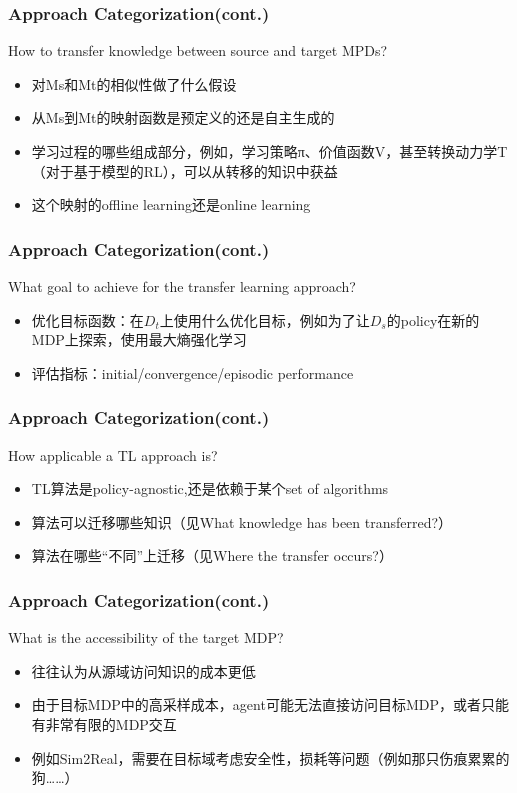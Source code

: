\documentclass[aspectratio=169]{beamer}
\begin{document}
\begin{frame}
  \frametitle{Approach Categorization(cont.)}
  How to transfer knowledge between source and target MPDs?
  \begin{itemize}
    \item 对Ms和Mt的相似性做了什么假设
    \item 从Ms到Mt的映射函数是预定义的还是自主生成的
    \item 学习过程的哪些组成部分，例如，学习策略π、价值函数V，甚至转换动力学T（对于基于模型的RL），可以从转移的知识中获益
    \item 这个映射的offline learning还是online learning
  \end{itemize}
\end{frame}


\begin{frame}
  \frametitle{Approach Categorization(cont.)}
  What goal to achieve for the transfer learning approach?
  \begin{itemize}
    \item 优化目标函数：在$D_t$上使用什么优化目标，例如为了让$D_s$的policy在新的MDP上探索，使用最大熵强化学习
    \item 评估指标：initial/convergence/episodic performance
  \end{itemize}
\end{frame}


\begin{frame}
  \frametitle{Approach Categorization(cont.)}
  How applicable a TL approach is?
  \begin{itemize}
    \item TL算法是policy-agnostic,还是依赖于某个set of algorithms
    \item 算法可以迁移哪些知识（见What knowledge has been transferred?）
    \item 算法在哪些“不同”上迁移（见Where the transfer occurs?）
  \end{itemize}
\end{frame}

\begin{frame}
  \frametitle{Approach Categorization(cont.)}
  What is the accessibility of the target MDP?
  \begin{itemize}
    \item 往往认为从源域访问知识的成本更低
    \item 由于目标MDP中的高采样成本，agent可能无法直接访问目标MDP，或者只能有非常有限的MDP交互
    \item 例如Sim2Real，需要在目标域考虑安全性，损耗等问题（例如那只伤痕累累的狗……）
  \end{itemize}
\end{frame}
\end{document}
